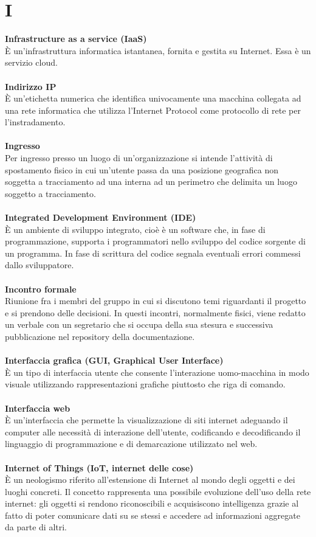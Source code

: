 \section{I}
\textbf{Infrastructure as a service (IaaS)}\\ 
È un'infrastruttura informatica istantanea, fornita e gestita su Internet. Essa è un servizio cloud. \\ \\
\textbf{Indirizzo IP}\\
È un'etichetta numerica che identifica univocamente una macchina collegata ad una rete informatica che utilizza l'Internet Protocol come protocollo di rete per l'instradamento. \\ \\
\textbf{Ingresso}\\
Per ingresso presso un luogo di un'organizzazione si intende l'attività di spostamento fisico in cui un'utente passa da una posizione geografica non soggetta a tracciamento ad una interna ad un perimetro che delimita un luogo soggetto a tracciamento. \\ \\
\textbf{Integrated Development Environment (IDE)}\\
È un ambiente di sviluppo integrato, cioè è un software che, in fase di programmazione, supporta i programmatori nello sviluppo del codice sorgente di un programma. In fase di scrittura del codice segnala eventuali errori commessi dallo sviluppatore. \\ \\
\textbf{Incontro formale}\\
Riunione fra i membri del gruppo in cui si discutono temi riguardanti il progetto e si prendono delle decisioni.
In questi incontri, normalmente fisici, viene redatto un verbale con un segretario che si occupa della sua stesura e successiva pubblicazione nel repository della documentazione. \\ \\
\textbf{Interfaccia grafica (GUI, Graphical User Interface)}\\
È un tipo di interfaccia utente che consente l'interazione uomo-macchina in modo visuale utilizzando rappresentazioni grafiche piuttosto che riga di comando. \\ \\
\textbf{Interfaccia web}\\
È un'interfaccia che permette la visualizzazione di siti internet adeguando il computer alle necessità di interazione dell'utente, codificando e decodificando il linguaggio di programmazione e di demarcazione utilizzato nel web. \\ \\
\textbf{Internet of Things (IoT, internet delle cose)}\\
È un neologismo riferito all'estensione di Internet al mondo degli oggetti e dei luoghi concreti. Il concetto rappresenta una possibile evoluzione dell'uso della rete internet: gli oggetti si rendono riconoscibili e acquisiscono intelligenza grazie al fatto di poter comunicare dati su se stessi e accedere ad informazioni aggregate da parte di altri. \\ \\
\clearpage
